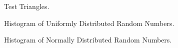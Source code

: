 \documentclass{article}
\begin{document}
\begin{figure}[ht!]
\begin{center}
\begin{tabular}{cc}
\end{tabular}
\end{center}
\caption{Test Triangles.}
\end{figure}
\pagebreak

\begin{figure}[ht!]
\begin{center}
\caption{Histogram of Uniformly Distributed Random Numbers.}
\end{center}
\end{figure}

\begin{figure}[ht!]
\begin{center}
\caption{Histogram of Normally Distributed Random Numbers.}
\end{center}
\end{figure}
\end{document}
